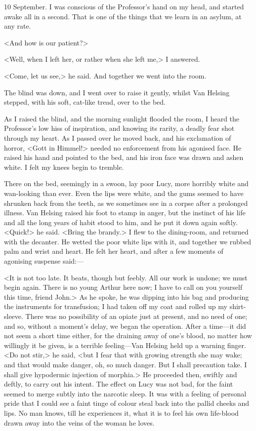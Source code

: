 \begin{diary}{10 September.}
I was conscious of the Professor's hand on my head, and started awake all in a second. That is one of the things that we learn in an asylum, at any rate.

<And how is our patient?>

<Well, when I left her, or rather when she left me,> I answered.

<Come, let us see,> he said. And together we went into the room.

The blind was down, and I went over to raise it gently, whilst Van Helsing stepped, with his soft, cat-like tread, over to the bed.

As I raised the blind, and the morning sunlight flooded the room, I heard the Professor's low hiss of inspiration, and knowing its rarity, a deadly fear shot through my heart. As I passed over he moved back, and his exclamation of horror, <Gott in Himmel!> needed no enforcement from his agonised face. He raised his hand and pointed to the bed, and his iron face was drawn and ashen white. I felt my knees begin to tremble.

There on the bed, seemingly in a swoon, lay poor Lucy, more horribly white and wan-looking than ever. Even the lips were white, and the gums seemed to have shrunken back from the teeth, as we sometimes see in a corpse after a prolonged illness. Van Helsing raised his foot to stamp in anger, but the instinct of his life and all the long years of habit stood to him, and he put it down again softly. <Quick!> he said. <Bring the brandy.> I flew to the dining-room, and returned with the decanter. He wetted the poor white lips with it, and together we rubbed palm and wrist and heart. He felt her heart, and after a few moments of agonising suspense said:—

<It is not too late. It beats, though but feebly. All our work is undone; we must begin again. There is no young Arthur here now; I have to call on you yourself this time, friend John.> As he spoke, he was dipping into his bag and producing the instruments for transfusion; I had taken off my coat and rolled up my shirt-sleeve. There was no possibility of an opiate just at present, and no need of one; and so, without a moment's delay, we began the operation. After a time—it did not seem a short time either, for the draining away of one's blood, no matter how willingly it be given, is a terrible feeling—Van Helsing held up a warning finger. <Do not stir,> he said, <but I fear that with growing strength she may wake; and that would make danger, oh, so much danger. But I shall precaution take. I shall give hypodermic injection of morphia.> He proceeded then, swiftly and deftly, to carry out his intent. The effect on Lucy was not bad, for the faint seemed to merge subtly into the narcotic sleep. It was with a feeling of personal pride that I could see a faint tinge of colour steal back into the pallid cheeks and lips. No man knows, till he experiences it, what it is to feel his own life-blood drawn away into the veins of the woman he loves.


\end{diary}
